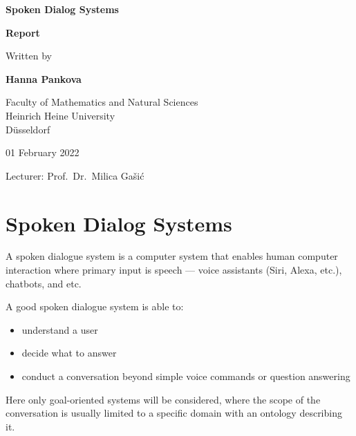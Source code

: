 \documentclass[12pt,titlepage,a4paper]{article}
\begin{document}
\begin{titlepage}
\begin{center}

\textbf{\LARGE Spoken Dialog Systems}

\bigskip\bigskip
\textbf{Report}

\bigskip\bigskip\bigskip
Written by

\bigskip
\textbf{Hanna Pankova}


\vfill
Faculty of Mathematics and Natural Sciences\\ 
Heinrich Heine University \\
D\"usseldorf

\bigskip
01 February 2022

\bigskip
Lecturer: Prof.\ Dr.\ Milica Ga\v{s}i\'{c}

\end{center}
\end{titlepage}

\thispagestyle{empty}\mbox{}
\setcounter{page}{0}

\tableofcontents

\pagebreak
\section{Spoken Dialog Systems}
A spoken dialogue system is a computer system that enables human computer interaction where primary input is speech --- voice assistants (Siri, Alexa, etc.), chatbots, and etc. \par

A good spoken dialogue system is able to:
\begin{itemize}
     \item understand a user
     \item decide what to answer
     \item conduct a conversation beyond simple voice commands or question answering
\end{itemize}

Here only goal-oriented systems will be considered, where the scope of the conversation is usually limited to a specific domain with an ontology describing it.
\end{document}
